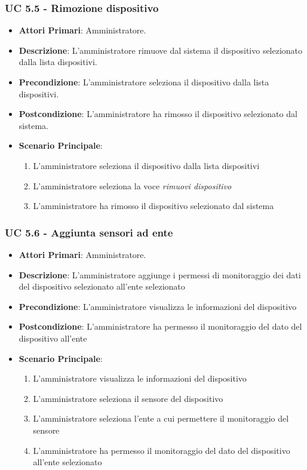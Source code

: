 			\subsubsection{UC 5.5 - Rimozione dispositivo}
			\begin{itemize}
				\item \textbf{Attori Primari}: Amministratore.
				\item \textbf{Descrizione}: L'amministratore rimuove dal sistema il dispositivo selezionato dalla lista dispositivi.
				\item \textbf{Precondizione}: L'amministratore seleziona il dispositivo dalla lista dispositivi.
				\item \textbf{Postcondizione}: L'amministratore ha rimosso il dispositivo selezionato dal sistema.
				\item \textbf{Scenario Principale}:
				\begin{enumerate}
					\item{L'amministratore seleziona il dispositivo dalla lista dispositivi}
					\item{L'amministratore seleziona la voce \textit{rimuovi dispositivo}}
					\item{L'amministratore ha rimosso il dispositivo selezionato dal sistema}
				\end{enumerate}
			\end{itemize}
			
			\subsubsection{UC 5.6 - Aggiunta sensori ad ente}
			\begin{itemize}
				\item \textbf{Attori Primari}: Amministratore.
				\item \textbf{Descrizione}: L'amministratore aggiunge i permessi di monitoraggio dei dati del dispositivo selezionato all'ente selezionato
				\item \textbf{Precondizione}: L'amministratore visualizza le informazioni del dispositivo
				\item \textbf{Postcondizione}: L'amministratore ha permesso il monitoraggio del dato del dispositivo all'ente
				\item \textbf{Scenario Principale}:
				\begin{enumerate}
					\item{L'amministratore visualizza le informazioni del dispositivo}
					\item{L'amministratore seleziona il sensore del dispositivo}
					\item{L'amministratore seleziona l'ente a cui permettere il monitoraggio del sensore}
					\item{L'amministratore ha permesso il monitoraggio del dato del dispositivo all'ente selezionato}
				\end{enumerate}
			\end{itemize}
			

